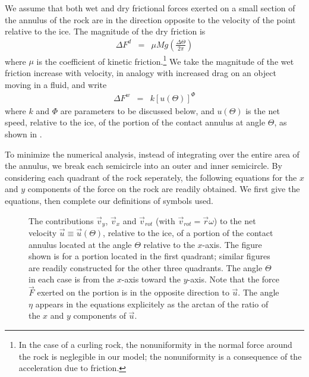 {\begin{flowtext}{2}
We assume that both wet and dry frictional forces exerted on a small section of
the annulus of the rock are in the direction opposite to the velocity of the
point relative to the ice. The magnitude of the dry friction is
\begin{eqnarray}
\Delta F^d &=& \mu M g \left( \frac{\Delta\Theta}{2\pi}\right)
\end{eqnarray}
where $\mu$ is the coefficient of kinetic friction.\footnote{In the case of a
curling rock, the nonuniformity in the normal force around the rock is
neglegible in our model; the nonuniformity is a consequence of the acceleration
due to friction.} We take the magnitude of the wet friction increase with
velocity, in analogy with increased drag on an object moving in a fluid, and
write
\begin{eqnarray}
\Delta F^w &=& k \left[ u(\Theta) \right]^\Phi
\end{eqnarray}
where $k$ and $\Phi$ are parameters to be discussed below, and $u(\Theta)$ is
the net speed, relative to the ice, of the portion of the contact annulus at
angle $\Theta$, as shown in .

To minimize the numerical analysis, instead of integrating over the entire area
of the annulus, we break each semicircle into an outer and inner semicircle. By
considering each quadrant of the rock seperately, the following equations for
the $x$ and $y$ components of the force on the rock are readily obtained. We
first give the equations, then complete our definitions of symbols used.
\end{flowtext}

\begin{figure}[htb] 
\begin{center} 

\end{center} 
\caption[Shegelski et al.\ setup]{The contributions $\vec{v}_y$,
    $\vec{v}_x$ and $\vec{v}_{rot}$ (with $\vec{v}_{rot} = \vec{r}\omega$) to
    the net velocity $\vec{u} \equiv \vec{u}(\Theta)$, relative to the ice, of
    a portion of the contact annulus located at the angle $\Theta$ relative to
    the $x$-axis. The figure shown is for a portion located in the first
    quadrant; similar figures are readily constructed for the other three
    quadrants. The angle $\Theta$ in each case is from the $x$-axis toward the
    $y$-axis. Note that the force $\vec{F}$ exerted on the portion is in the
    opposite direction to $\vec{u}$. The angle $\eta$ appears in the equations
    explicitely as the arctan of the ratio of the $x$ and $y$ components of
    $\vec{u}$. 
    } 
\end{figure}

}
